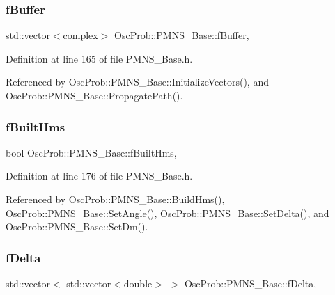 \subsubsection{\texorpdfstring{f\+Buffer}{fBuffer}}
{\footnotesize\ttfamily std\+::vector$<$\hyperlink{classOscProb_1_1PMNS__Base_ae86ec4718808ce9d02e5f5b4226714ab}{complex}$>$ Osc\+Prob\+::\+P\+M\+N\+S\+\_\+\+Base\+::f\+Buffer\hspace{0.3cm}{\ttfamily [protected]}, {\ttfamily [inherited]}}



Definition at line 165 of file P\+M\+N\+S\+\_\+\+Base.\+h.



Referenced by Osc\+Prob\+::\+P\+M\+N\+S\+\_\+\+Base\+::\+Initialize\+Vectors(), and Osc\+Prob\+::\+P\+M\+N\+S\+\_\+\+Base\+::\+Propagate\+Path().

\mbox{\label{classOscProb_1_1PMNS__Base_a9ac3cadeac8db1b90f3152f476244780}} 
\subsubsection{\texorpdfstring{f\+Built\+Hms}{fBuiltHms}}
{\footnotesize\ttfamily bool Osc\+Prob\+::\+P\+M\+N\+S\+\_\+\+Base\+::f\+Built\+Hms\hspace{0.3cm}{\ttfamily [protected]}, {\ttfamily [inherited]}}



Definition at line 176 of file P\+M\+N\+S\+\_\+\+Base.\+h.



Referenced by Osc\+Prob\+::\+P\+M\+N\+S\+\_\+\+Base\+::\+Build\+Hms(), Osc\+Prob\+::\+P\+M\+N\+S\+\_\+\+Base\+::\+Set\+Angle(), Osc\+Prob\+::\+P\+M\+N\+S\+\_\+\+Base\+::\+Set\+Delta(), and Osc\+Prob\+::\+P\+M\+N\+S\+\_\+\+Base\+::\+Set\+Dm().

\mbox{\label{classOscProb_1_1PMNS__Base_ab2a5fa40e689b221c8a7d2c17213810d}} 
\subsubsection{\texorpdfstring{f\+Delta}{fDelta}}
{\footnotesize\ttfamily std\+::vector$<$ std\+::vector$<$double$>$ $>$ Osc\+Prob\+::\+P\+M\+N\+S\+\_\+\+Base\+::f\+Delta\hspace{0.3cm}{\ttfamily [protected]}, {\ttfamily [inherited]}}



